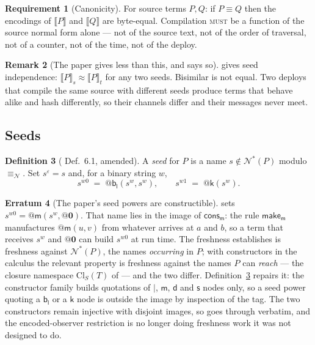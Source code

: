 \documentclass[11pt,a4paper]{article}
\makeatletter
\newcommand{\MUST}{\textsc{must}}
\newcommand{\quo}[1]{@#1}
\newcommand{\nil}{\mathbf{0}}
\newcommand{\enc}[1]{\llbracket #1 \rrbracket}
\newcommand{\nequiv}{\equiv_{\mathcal{N}}}
\newcommand{\bisim}{\approx}
\newcommand{\nms}[1]{\mathcal{N}^{*}(#1)}
\newcommand{\mm}{\mathsf{m}}
\newcommand{\dd}{\mathsf{d}}
\newcommand{\kk}{\mathsf{k}}
\newcommand{\bl}{\mathsf{b}_{\mathsf{l}}}
\newcommand{\sy}{\mathsf{s}}
\newcommand{\cons}{\mathsf{cons}}
\newcommand{\scong}{\equiv}
\newcommand{\Cl}{\mathrm{Cl}}
\theoremstyle{definition}
\newtheorem{definition}{Definition}[section]
\newtheorem{requirement}[definition]{Requirement}
\newtheorem{erratum}[definition]{Erratum}
\newtheorem{remark}[definition]{Remark}
\theoremstyle{plain}
\makeatother
\begin{document}
\begin{requirement}[Canonicity]\label{req:canon}
For source terms $P, Q$: if $P \scong Q$ then the encodings of $\enc{P}$ and
$\enc{Q}$ are byte-equal. Compilation \MUST{} be a function of the source
normal form alone --- not of the source text, not of the order of traversal,
not of a counter, not of the time, not of the deploy.
\end{requirement}

\begin{remark}[The paper gives less than this, and says so]
\cite[Lem.~7.8]{draft3} gives seed independence: $\enc{P}_{s} \bisim
\enc{P}_{t}$ for any two seeds. Bisimilar is not equal. Two deploys that
compile the same source with different seeds produce terms that behave alike
and hash differently, so their channels differ and their messages never meet.
\end{remark}

\subsection{Seeds}

\begin{definition}[\cite{draft3} Def.~6.1, amended]\label{def:seed}
A \emph{seed} for $P$ is a name $s \notin \nms{P}$ modulo $\nequiv$. Set
$s^{\varepsilon} = s$ and, for a binary string $w$,
\[
  s^{w0} \;=\; \quo{\bl(s^{w},s^{w})},
  \qquad
  s^{w1} \;=\; \quo{\kk(s^{w})}.
\]
\end{definition}

\begin{erratum}[The paper's seed powers are constructible]\label{err:seed}
\cite[Def.~6.1]{draft3} sets $s^{w0} = \quo{\mm(s^{w},\quo{\nil})}$. That name
lies in the image of $\cons_{\mm}$: the rule $\mathsf{make}_{\mm}$
manufactures $\quo{\mm(u,v)}$ from whatever arrives at $a$ and $b$, so a term
that receives $s^{w}$ and $\quo{\nil}$ can build $s^{w0}$ at run time. The
freshness \cite[Lem.~6.2]{draft3} establishes is freshness against $\nms{P}$,
the names \emph{occurring} in $P$; with constructors in the calculus the
relevant property is freshness against the names $P$ can \emph{reach} --- the
closure namespace $\Cl_{S}(T)$ of \cite[Def.~8.1]{logic} --- and the two
differ. Definition~\ref{def:seed} repairs it: the constructor family builds
quotations of $\mid$, $\mm$, $\dd$ and $\sy$ nodes only, so a seed power
quoting a $\bl$ or a $\kk$ node is outside the image by inspection of the tag.
The two constructors remain injective with disjoint images, so
\cite[Lem.~6.2]{draft3} goes through verbatim, and the encoded-observer
restriction is no longer doing freshness work it was not designed to do.
\end{erratum}
\end{document}
